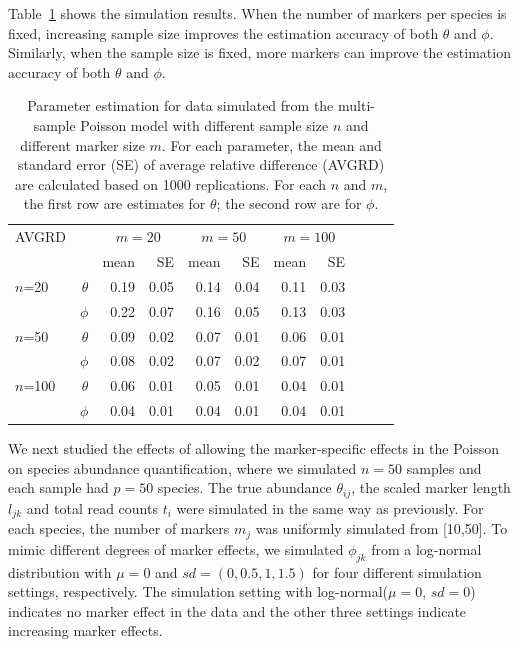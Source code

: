 Table~\ref{MSSQTable1} shows the simulation results. When the number of markers per species is fixed, increasing  sample size improves the estimation accuracy of both $\theta$ and $\phi$. Similarly, when the sample size is fixed, more markers can improve the estimation accuracy of both $\theta$ and $\phi$.

\begin{table}[ht]
	\caption[Parameter estimation for data simulated from the multi-sample Poisson model]{Parameter estimation for data simulated from the multi-sample Poisson model with different sample size $n$ and different marker size $m$.  For each parameter, the mean and standard error (SE) of average relative difference (AVGRD) are calculated based on 1000 replications. For each $n$ and $m$, the first row are estimates for $\theta$; the second row are for $\phi$.   
		\label{MSSQTable1}}
	\begin{center}	\begin{tabular}{lrrrrrrrrrr}
			\hline
			AVGRD& & \multicolumn{2}{c}{$m = 20$} & \multicolumn{2}{c}{$m = 50$}  & \multicolumn{2}{c}{$m = 100$}    \\
			\cline{3-8}
			& & mean & SE & mean & SE & mean &  SE &  \\
			\hline
			$n$=20 & $\theta$ & 0.19 & 0.05 & 0.14 & 0.04 & 0.11 & 0.03  \\
			& $\phi$ & 0.22 & 0.07 & 0.16 & 0.05 & 0.13 & 0.03  \\
			$n$=50 & $\theta$ & 0.09 & 0.02 & 0.07 & 0.01 & 0.06 & 0.01  \\
			& $\phi$ & 0.08 & 0.02 & 0.07 & 0.02 & 0.07 & 0.01  \\
			$n$=100 & $\theta$ & 0.06 & 0.01 & 0.05 & 0.01 & 0.04 & 0.01  \\
			& $\phi$ & 0.04 & 0.01 & 0.04 & 0.01 & 0.04 & 0.01  \\
			
			\hline
		\end{tabular}
	\end{center}
\end{table}


We next  studied the effects of allowing the marker-specific effects in the Poisson on species abundance quantification, where we simulated $n=50$ samples and each sample had $p=50$ species.  The true abundance $\theta_{ij}$, the scaled marker length $l_{jk}$ and total read counts $t_i$ were simulated in the  same way  as previously. For each species, the number of markers $m_j$ was uniformly simulated from [10,50]. To mimic  different degrees of marker effects, we simulated $\phi_{jk}$ from a log-normal distribution with $\mu=0$ and $sd=(0, 0.5, 1, 1.5)$ for four different simulation settings, respectively. The simulation setting with log-normal($\mu=0$, $sd=0$) indicates no marker effect in the data and the other three settings indicate increasing marker effects.


